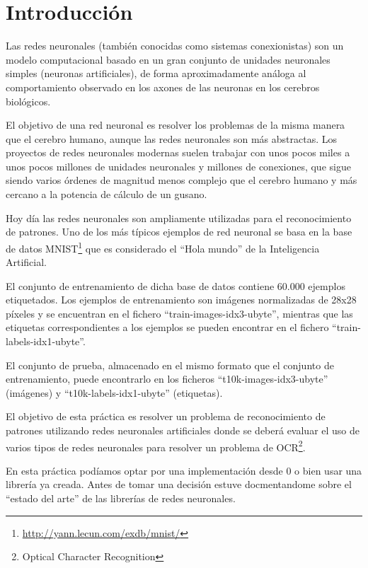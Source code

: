 \chapter{Introducción}

Las redes neuronales (también conocidas como sistemas conexionistas) son un modelo computacional basado en un gran conjunto de unidades neuronales simples (neuronas artificiales), de forma aproximadamente análoga al comportamiento observado en los axones de las neuronas en los cerebros biológicos.

\bigskip
El objetivo de una red neuronal es resolver los problemas de la misma manera que el cerebro humano, aunque las redes neuronales son más abstractas. Los proyectos de redes neuronales modernas suelen trabajar con unos pocos miles a unos pocos millones de unidades neuronales y millones de conexiones, que sigue siendo varios órdenes de magnitud menos complejo que el cerebro humano y más cercano a la potencia de cálculo de un gusano.

\bigskip
Hoy día las redes neuronales son ampliamente utilizadas para el reconocimiento de patrones. Uno de los más típicos ejemplos de red neuronal se basa en la base de datos MNIST\footnote{\url{http://yann.lecun.com/exdb/mnist/}} que es considerado el ``Hola mundo'' de la Inteligencia Artificial.

\bigskip
El conjunto de entrenamiento de dicha base de datos contiene 60.000 ejemplos etiquetados. Los ejemplos de entrenamiento son imágenes normalizadas de 28x28 píxeles y se encuentran en el fichero ``train-images-idx3-ubyte'', mientras que las etiquetas correspondientes a los ejemplos se pueden encontrar en el fichero ``train-labels-idx1-ubyte''.

\bigskip
El conjunto de prueba, almacenado en el mismo formato que el conjunto de entrenamiento, puede encontrarlo en los ficheros ``t10k-images-idx3-ubyte'' (imágenes) y ``t10k-labels-idx1-ubyte'' (etiquetas).

\bigskip
El objetivo de esta práctica es resolver un problema de reconocimiento de patrones utilizando redes neuronales artificiales donde se deberá evaluar el uso de varios tipos de redes neuronales para resolver un problema de OCR\footnote{Optical Character Recognition}.

\bigskip
En esta práctica podíamos optar por una implementación desde 0 o bien usar una librería ya creada. Antes de tomar una decisión estuve docmentandome sobre el ``estado del arte'' de las librerías de redes neuronales.


